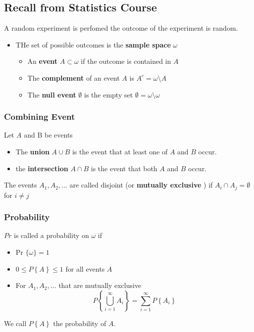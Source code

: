 \documentclass{article}
\theoremstyle{remark}
\begin{document}
\subsection{Recall from Statistics Course}%
\label{sub:recall_from_statistics_course}

A random experiment is perfomed the outcome of the experiment is random.
\begin{itemize}
  \item THe set of possible outcomes is the \textbf{sample space}  $\omega $ 
    \begin{itemize}
      \item An \textbf{event}  $A \subset \omega $  if the outcome is contained in $A$
      \item The \textbf{complement}  of an event $A$ is  $A^{c} = \omega  \setminus A$ 
      \item The \textbf{null event} $\emptyset$ is the empty set $\emptyset = \omega \setminus \omega $ 
    \end{itemize}
\end{itemize}

\subsubsection{Combining Event}%
\label{ssub:combining_event}

Let $A$ and B be events 
\begin{itemize}
  \item The \textbf{union} $A \cup  B$ is the event that at least one of $A$ and $B$ occur.
  \item the \textbf{intersection}  $A \cap B$ is the event that both $A$ and $B$ occur.
\end{itemize}

The events $A_{1}, A_{2}, \ldots$ are called disjoint (or \textbf{mutually exclusive} ) if $A_{i} \cap A_{j} = \emptyset$ for $i \neq j$

\subsubsection{Probability}%
\label{ssub:probability}

$Pr$ is called a probability on $\omega $ if 

\begin{itemize}
  \item Pr $\{ \omega \} = 1  $ 
  \item $0 \le P\left\{ A \right\} \le 1$ for all events $A$ 
  \item For $A_{1}, A_{2} , \ldots$ that are mutually exclusive \[
  P \left\{ \bigcup_{i = 1}^{\infty}A_{i}  \right\} = \sum_{i=1}^{\infty} P \left\{ A_{i} \right\}
  \] 
\end{itemize}
We call $P\left\{ A \right\}$ the probability of $A$.
\end{document}

